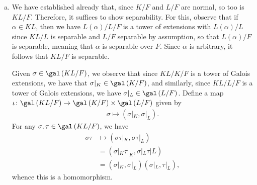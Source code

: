 \documentclass[10pt]{mypackage}
\begin{document}
\begin{solution}\hfill
  \begin{enumerate}[(a)]
    \item We have established already that, since $K/F$ and $L/F$ are normal, so too is $KL/F$. Therefore, it suffices to show separability. For this, observe that if $\alpha\in KL$, then we have $L(\alpha)/L/F$ is a tower of extensions with $L(\alpha)/L$ since $KL/L$ is separable and $L/F$ separable by assumption, so that $L\left( \alpha \right)/F$ is separable, meaning that $\alpha$ is separable over $F$. Since $\alpha$ is arbitrary, it follows that $KL/F$ is separable.

      Given $\sigma\in \gal\left( KL/F \right)$, we observe that since $KL/K/F$ is a tower of Galois extensions, we have that $\sigma|_{K}\in \gal\left( K/F \right)$, and similarly, since $KL/L/F$ is a tower of Galois extensions, we have $\sigma|_{L}\in \gal\left( L/F \right)$. Define a map $\iota\colon \gal\left( KL/F \right)\rightarrow \gal\left( K/F \right)\times \gal\left( L/F \right)$ given by
      \begin{align*}
        \sigma\mapsto \left( \sigma|_{K},\sigma|_{L} \right).
      \end{align*}
      For any $\sigma,\tau\in \gal\left( KL/F \right)$, we have
      \begin{align*}
        \sigma\tau &\mapsto \left( \sigma\tau|_{K},\sigma\tau|_{L} \right)\\
                   &= \left( \sigma|_{K}\tau|_{K},\sigma|_{L}\tau|{L} \right)\\
                   &= \left( \sigma|_{K},\sigma|_{L} \right) \left( \sigma|_{L},\tau|_{L} \right),
      \end{align*}
      whence this is a homomorphism.


\end{enumerate}
\end{solution}
\end{document}
